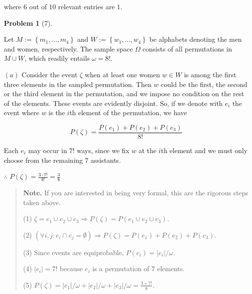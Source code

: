 \documentclass[a4paper, 12pt]{article}
\newtheorem{problem}{Problem}
\newtheorem{problem}{Problem}
\begin{document}
   where $6$ out of $10$ relevant entries are $1$.


   \pagebreak 

   \begin{problem}[7]
       
   \end{problem}

   Let $M := \left\{ m_1, \ldots, m_4 \right\} $ and $W := \left\{ w_1, \ldots,
   w_4 \right\} $ be alphabets denoting the men and women, respectively. The
   sample space $\Omega$ consists of all permutations in $M \cup W$, which
   readily entails $\omega = 8!$.

   $(a)$ Consider the event $\zeta$ when at least one women $w \in W$ is among the first three elements in the 
   sampled permutation. Then $w$ could be the first, the second or the third element in the permutation, 
   and we impose no condition on the rest of the elements. These events are evidently disjoint. So, 
   if we denote with $e_i$ the event where $w$ is the $i$th element of the permutation, we have 

   \begin{equation*}
       P(\zeta) = \frac{ P(e_1) + P(e_2) + P(e_3) }{8!}
   \end{equation*}

   Each $e_i$ may occur in $7!$ ways, since we fix $w$ at the $i$th element and we must only 
   choose from the remaining $7$ assistants.


   $\therefore $ $P(\zeta) = \frac{ 3 \cdot 7! }{8!} = \frac{3}{8}$

   
   \small
   \begin{quote}
   
   \textbf{Note.} If you are interested in being very formal, this are the rigorous 
   steps taken above.
   
   (1) $\zeta = e_1 \cup e_2 \cup  e_3 \Rightarrow P(\zeta) = P(e_1 \cup e_2 \cup e_3)$.

   (2) $( \forall i, j : e_i \cap e_j = \emptyset ) \Rightarrow P(\zeta) = P(e_1) + P(e_2) + P(e_3)$. 
   
   (3) Since events are equiprobable, $P(e_i) = |e_i| / \omega$. 

   (4) $|e_i| = 7!$ because $e_i$ is a permutation of $7$ elements.

   (5) $P(\zeta) = |e_1|/\omega + |e_2| / \omega + |e_3|/\omega = \frac{3\times 7!}{8}$.
   
   \end{quote}
   \normalsize
   
\end{document}
